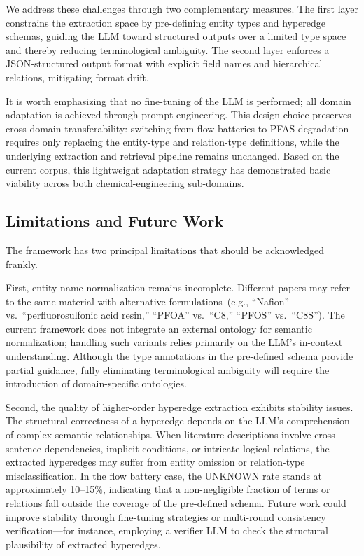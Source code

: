 \documentclass[11pt,a4paper]{article}
\begin{document}
We address these challenges through two complementary measures. The first layer constrains the extraction space by pre-defining entity types and hyperedge schemas, guiding the LLM toward structured outputs over a limited type space and thereby reducing terminological ambiguity. The second layer enforces a JSON-structured output format with explicit field names and hierarchical relations, mitigating format drift.

It is worth emphasizing that no fine-tuning of the LLM is performed; all domain adaptation is achieved through prompt engineering. This design choice preserves cross-domain transferability: switching from flow batteries to PFAS degradation requires only replacing the entity-type and relation-type definitions, while the underlying extraction and retrieval pipeline remains unchanged. Based on the current corpus, this lightweight adaptation strategy has demonstrated basic viability across both chemical-engineering sub-domains.

\subsection{Limitations and Future Work}

The framework has two principal limitations that should be acknowledged frankly.

First, entity-name normalization remains incomplete. Different papers may refer to the same material with alternative formulations~(e.g., ``Nafion'' vs.~``perfluorosulfonic acid resin,'' ``PFOA'' vs.~``C8,'' ``PFOS'' vs.~``C8S''). The current framework does not integrate an external ontology for semantic normalization; handling such variants relies primarily on the LLM's in-context understanding. Although the type annotations in the pre-defined schema provide partial guidance, fully eliminating terminological ambiguity will require the introduction of domain-specific ontologies.

Second, the quality of higher-order hyperedge extraction exhibits stability issues. The structural correctness of a hyperedge depends on the LLM's comprehension of complex semantic relationships. When literature descriptions involve cross-sentence dependencies, implicit conditions, or intricate logical relations, the extracted hyperedges may suffer from entity omission or relation-type misclassification. In the flow battery case, the UNKNOWN rate stands at approximately 10--15\%, indicating that a non-negligible fraction of terms or relations fall outside the coverage of the pre-defined schema. Future work could improve stability through fine-tuning strategies or multi-round consistency verification---for instance, employing a verifier LLM to check the structural plausibility of extracted hyperedges.
\end{document}
